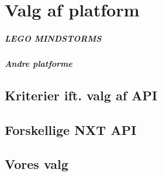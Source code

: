 
\chapter{Valg af platform}


\paragraph{LEGO MINDSTORMS}

\paragraph{Andre platforme}

\section{Kriterier ift. valg af API}

\section{Forskellige NXT API}

\section{Vores valg}
